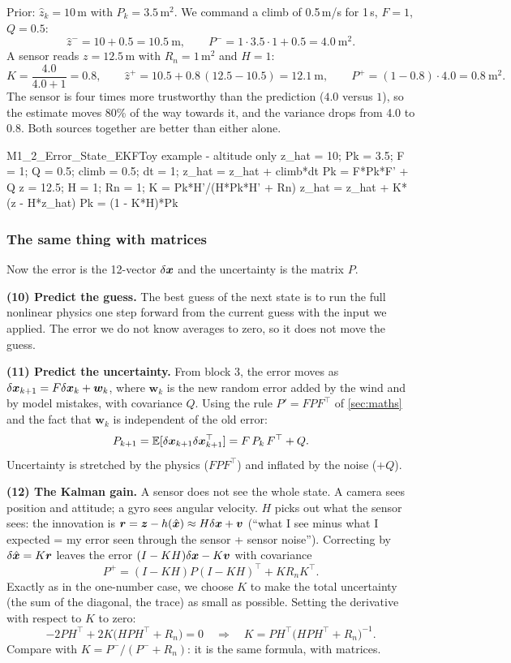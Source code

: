 \begin{toy}
Prior: $\hat z_k=10$\,m with $P_k=3.5$\,m$^2$. We command a climb of 0.5\,m/s for 1\,s, $F=1$, $Q=0.5$:
\[
\hat z^-=10+0.5=10.5\ \text{m},\qquad P^-=1\cdot3.5\cdot1+0.5=4.0\ \text{m}^2 .
\]
A sensor reads $z=12.5$\,m with $R_n=1$\,m$^2$ and $H=1$:
\[
K=\frac{4.0}{4.0+1}=0.8,\qquad \hat z^+=10.5+0.8\,(12.5-10.5)=12.1\ \text{m},\qquad P^+=(1-0.8)\cdot4.0=0.8\ \text{m}^2 .
\]
The sensor is four times more trustworthy than the prediction ($4.0$ versus $1$), so the estimate moves 80\% of the
way towards it, and the variance drops from 4.0 to 0.8. Both sources together are better than either alone.
\end{toy}

\begin{toycode}{M1\_2\_Error\_State\_EKF}{Toy example - altitude only}
z_hat = 10;  Pk = 3.5;  F = 1;  Q = 0.5;  climb = 0.5;  dt = 1;
z_hat = z_hat + climb*dt          %
Pk    = F*Pk*F' + Q               %
z = 12.5;  H = 1;  Rn = 1;
K     = Pk*H'/(H*Pk*H' + Rn)      %
z_hat = z_hat + K*(z - H*z_hat)   %
Pk    = (1 - K*H)*Pk              %
\end{toycode}

\subsubsection*{The same thing with matrices}
Now the error is the 12-vector $\delta\bm{x}$ and the uncertainty is the matrix $P$.

\textbf{(10) Predict the guess.} The best guess of the next state is to run the full nonlinear physics one step
forward from the current guess with the input we applied. The error we do not know averages to zero, so it does not
move the guess.

\textbf{(11) Predict the uncertainty.} From block 3, the error moves as $\delta\bm{x}_{k+1}=F\delta\bm{x}_k+\bm w_k$, where
$\bm w_k$ is the new random error added by the wind and by model mistakes, with covariance $Q$. Using the rule
$P'=FPF^\top$ of \cref{sec:maths} and the fact that $\bm w_k$ is independent of the old error:
\[
P_{k+1}=\mathbb E[\delta\bm{x}_{k+1}\delta\bm{x}_{k+1}^\top]=F\,P_k\,F^\top+Q .
\]
Uncertainty is stretched by the physics ($FPF^\top$) and inflated by the noise ($+Q$).

\textbf{(12) The Kalman gain.} A sensor does not see the whole state. A camera sees position and attitude; a gyro
sees angular velocity. $H$ picks out what the sensor sees: the innovation is $\bm{r}=\bm{z}-h(\hat{\bm x})\approx H\delta\bm{x}+\bm v$
(``what I see minus what I expected = my error seen through the sensor + sensor noise''). Correcting by
$\delta\hat{\bm{x}}=K\bm{r}$ leaves the error $(I-KH)\delta\bm{x}-K\bm v$ with covariance
\[
P^+=(I-KH)P(I-KH)^\top+KR_nK^\top .
\]
Exactly as in the one-number case, we choose $K$ to make the total uncertainty (the sum of the diagonal, the trace)
as small as possible. Setting the derivative with respect to $K$ to zero:
\[
-2PH^\top+2K\big(HPH^\top+R_n\big)=0\quad\Longrightarrow\quad K=PH^\top\big(HPH^\top+R_n\big)^{-1}.
\]
Compare with $K=P^-/(P^-+R_n)$: it is the same formula, with matrices.


